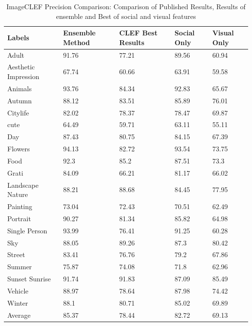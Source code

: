 \begin{table}
\centering
\caption{ ImageCLEF Precision Comparison: Comparison of Published Results, Results of ensemble and Best of social and visual features} %
\vspace*{0.2 cm}
\begin{tabular}{| p{2.1cm}| p{1.5cm}|p{1.2cm}|p{1.2cm}|p{1.2cm}|} \hline
 Labels & Ensemble Method & CLEF Best Results & Social Only & Visual Only  \\  [1ex] \hline
Adult & 91.76 & 77.21 & 89.56 & 60.94  \\  [1ex] \hline
Aesthetic Impression & 67.74 & 60.66 & 63.91 & 59.58  \\  [1ex] \hline
Animals & 93.76 & 84.34 & 92.83 & 65.67  \\  [1ex] \hline
Autumn & 88.12 & 83.51 & 85.89 & 76.01  \\  [1ex] \hline
Citylife & 82.02 & 78.37 & 78.47 & 69.87  \\  [1ex] \hline
cute & 64.49 & 59.71 & 63.11 & 55.11  \\  [1ex] \hline
Day & 87.43 & 80.75 & 84.15 & 67.39  \\  [1ex] \hline
Flowers & 94.13 & 82.72 & 93.54 & 73.75  \\  [1ex] \hline
Food & 92.3 & 85.2 & 87.51 & 73.3  \\  [1ex] \hline
Grati & 84.09 & 66.21 & 81.17 & 66.02  \\  [1ex] \hline
Landscape Nature & 88.21 & 88.68 & 84.45 & 77.95  \\  [1ex] \hline
Painting & 73.04 & 72.43 & 70.51 & 62.49  \\  [1ex] \hline
Portrait & 90.27 & 81.34 & 85.82 & 64.98  \\  [1ex] \hline
Single Person & 93.99 & 76.41 & 91.25 & 60.28  \\  [1ex] \hline
Sky & 88.05 & 89.26 & 87.3 & 80.42  \\  [1ex] \hline
Street & 83.41 & 76.76 & 79.2 & 67.86  \\  [1ex] \hline
Summer & 75.87 & 74.08 & 71.8 & 62.96  \\  [1ex] \hline
Sunset Sunrise & 91.74 & 91.83 & 87.09 & 85.49  \\  [1ex] \hline
Vehicle & 88.97 & 78.64 & 87.98 & 74.42  \\  [1ex] \hline
Winter & 88.1 & 80.71 & 85.02 & 69.89  \\  [1ex] \hline
Average & 85.37 & 78.44 & 82.72 & 69.13  \\  [1ex] \hline
\end{tabular}
 \label{ImageCLEFPrecisionOverAll} %
\end{table}

